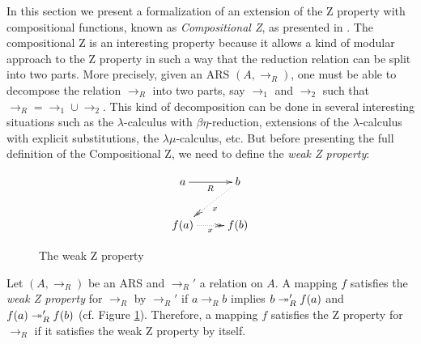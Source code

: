     In this section we present a formalization of an extension of the
    Z property with compositional functions, known as \textit{Compositional
    Z}, as presented in \cite{Nakazawa-Fujita2016}. The
    compositional Z is an interesting property because it allows a
    kind of modular approach to the Z property in such a way that the
    reduction relation can be split into two parts. More precisely,
    given an ARS $(A,\to_R)$, one must be able to decompose the
    relation $\to_R$ into two parts, say $\to_1$ and $\to_2$ such that
    $\to_R = \to_1\cup \to_2$. This kind of decomposition can be done
    in several interesting situations such as the $\lambda$-calculus
    with $\beta\eta$-reduction\cite{Ba84}, extensions of the
    $\lambda$-calculus with explicit substitutions\cite{accl91}, the
    $\lambda\mu$-calculus\cite{Parigot92}, etc. But before
    presenting the full definition of the Compositional Z, we need
    to define the \textit{weak Z property}:


    \begin{figure}[h] \centering \[ \xymatrix{ a \ar[r]_R & b
        \ar@{.>>}[dl]^x\\ f(a) \ar@{.>>}[r]_x & f(b) \\ } \]
        \caption{The weak Z property}\label{fig:weakZ} \end{figure}


    \begin{definition} Let $(A,\to_R)$ be an ARS and $\to_R'$ a
     relation on $A$. A mapping $f$ satisfies the {\it weak Z
     property} for $\to_R$ by $\to_R'$ if $a\to_R b$ implies $b \twoheadrightarrow_R'
     f(a)$ and $f(a) \twoheadrightarrow_R' f(b)$ (cf. Figure
     \ref{fig:weakZ}). Therefore, a mapping $f$ satisfies the Z
     property for $\to_R$ if it satisfies the weak Z property by
     itself.  \end{definition}


